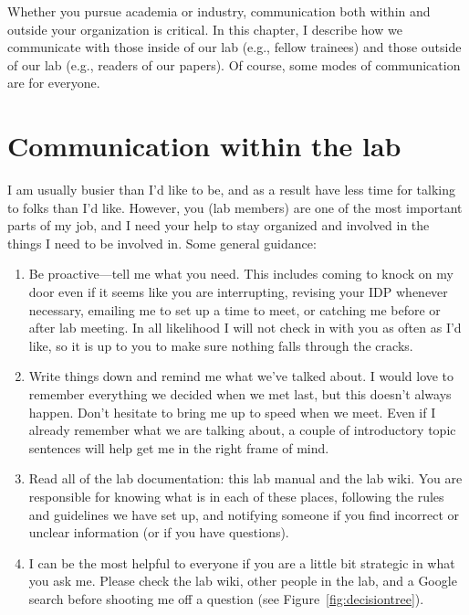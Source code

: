 \documentclass[letterpaper,11pt,oneside]{memoir}
\begin{document}
Whether you pursue academia or industry, communication both within and outside your organization is critical. In this chapter, I describe how we communicate with those inside of our lab (e.g., fellow trainees) and those outside of our lab (e.g., readers of our papers). Of course, some modes of communication are for everyone.

\section{Communication within the lab}
\label{sec:communicationInLab}

I am usually busier than I'd like to be, and as a result have less time for talking to folks than I'd like. However, you (lab members) are one of the most important parts of my job, and I need your help to stay organized and involved in the things I need to be involved in. Some general guidance:

\begin{enumerate}
\item Be proactive---tell me what you need. This includes coming to knock on my door even if it seems like you are interrupting, revising your IDP whenever necessary, emailing me to set up a time to meet, or catching me before or after lab meeting. In all likelihood I will not check in with you as often as I'd like, so it is up to you to make sure nothing falls through the cracks.
\item Write things down and remind me what we've talked about. I would love to remember everything we decided when we met last, but this doesn't always happen. Don't hesitate to bring me up to speed when we meet. Even if I already remember what we are talking about, a couple of introductory topic sentences will help get me in the right frame of mind.
\item Read all of the lab documentation: this lab manual and the lab wiki. You are responsible for knowing what is in each of these places, following the rules and guidelines we have set up, and notifying someone if you find incorrect or unclear information (or if you have questions).
\item I can be the most helpful to everyone if you are a little bit strategic in what you ask me. Please check the lab wiki, other people in the lab, and a Google search before shooting me off a question (see Figure~\ref{fig:decisiontree}).
\end{enumerate}
\end{document}
